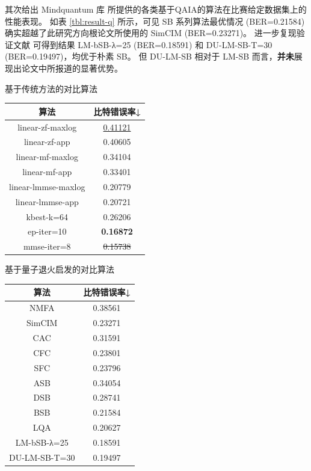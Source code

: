 \documentclass[withoutpreface,bwprint]{cumcmthesis}
\begin{document}
其次给出 Mindquantum 库 \cite{mindquantum2021} 所提供的各类基于QAIA的算法在比赛给定数据集上的性能表现。
如表 \ref{tbl:result-q} 所示，可见 SB 系列算法最优情况 (BER=0.21584) 确实超越了此研究方向根论文所使用的 SimCIM (BER=0.23271)。
进一步复现验证文献 \cite{Takabe2023} 可得到结果 LM-bSB-λ=25 (BER=0.18591) 和 DU-LM-SB-T=30 (BER=0.19497)，均优于朴素 SB。
但 DU-LM-SB 相对于 LM-SB 而言，\textbf{并未}展现出论文中所报道的显著优势。

\begin{minipage}{\textwidth}
\begin{minipage}[t]{0.45\textwidth}
	\centering
	\makeatletter{}\makeatother
	\caption{基于传统方法的对比算法\label{tbl:result-c}}
	\begin{tabular}{cc} 
		\textbf{算法} 			& \textbf{比特错误率↓} \\
		\hline
		linear-zf-maxlog		& \underline{0.41121} \\
		linear-zf-app			& 0.40605 \\
		linear-mf-maxlog		& 0.34104 \\
		linear-mf-app			& 0.33401 \\
		linear-lmmse-maxlog	& 0.20779 \\
		linear-lmmse-app		& 0.20721 \\
		kbest-k=64			& 0.26206 \\
		ep-iter=10			& \textbf{0.16872} \\
		mmse-iter=8			& \sout{0.15738} \\
	\end{tabular}
\end{minipage}
\begin{minipage}[t]{0.45\textwidth}
	\centering
	\makeatletter{}\makeatother
	\caption{基于量子退火启发的对比算法\label{tbl:result-q}}
	\begin{tabular}{cc}        
		\textbf{算法} 					& \textbf{比特错误率↓} \\
		\hline
		NMFA   						& 0.38561 \\
		SimCIM \cite{Singh2021} 			& 0.23271 \\
		CAC    						& 0.31591 \\
		CFC    						& 0.23801 \\
		SFC    						& 0.23796 \\
		ASB    						& 0.34054 \\
		DSB   						& 0.28741 \\
		BSB \cite{Goto2021} 			& 0.21584 \\
		LQA   						& 0.20627 \\
		LM-bSB-λ=25 \cite{Takabe2023} 	& 0.18591 \\
		DU-LM-SB-T=30 \cite{Takabe2023}	& 0.19497 \\
	\end{tabular}
\end{minipage}
\end{minipage}
\end{document}
